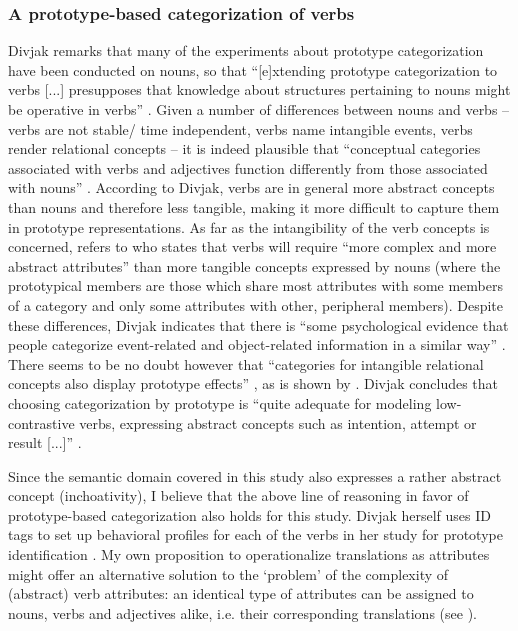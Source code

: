 \subsubsection{A prototype-based categorization of verbs}
\label{sec:2.4.3.2} 
Divjak remarks that many of the experiments about prototype categorization have been conducted on nouns, so that “[e]xtending prototype categorization to verbs [...] presupposes that knowledge about structures pertaining to nouns might be operative in verbs” \citep[150]{divjak_structuring_2010}. Given a number of differences between nouns and verbs –verbs are not stable/ time independent, verbs name intangible events, verbs render relational concepts \citep{divjak_structuring_2010} – it is indeed plausible that “conceptual categories associated with verbs and adjectives function differently from those associated with nouns” \citep{divjak_structuring_2010}. According to Divjak, verbs are in general more abstract concepts than nouns and therefore less tangible, making it more difficult to capture them in prototype representations. As far as the intangibility of the verb concepts is concerned, \citet[152]{divjak_structuring_2010} refers to \citet[114]{pulman_word_1983} who states that verbs will require “more complex and more abstract attributes” than more tangible concepts expressed by nouns (where the prototypical members are those which share most attributes with some members of a category and only some attributes with other, peripheral members). Despite these differences, Divjak indicates that there is “some psychological evidence that people categorize event-related and object-related information in a similar way” \citep[151]{divjak_structuring_2010}. There seems to be no doubt however that “categories for intangible relational concepts also display prototype effects” \citep[153]{divjak_structuring_2010}, as is shown by \citet{schmid_cottage_1993,taylor_linguistic_1995,taylor_linguistic_2003,geeraerts_preponderantieverschillen_1985, rudzka-ostyn_where_1988, geeraerts_homonymy_1990} \citep[153]{divjak_structuring_2010}. Divjak concludes that choosing categorization by prototype is “quite adequate for modeling low-contrastive verbs, expressing abstract concepts such as intention, attempt or result [...]” \citep[150]{divjak_structuring_2010}.

Since the semantic domain covered in this study also expresses a rather abstract concept (inchoativity), I believe that the above line of reasoning in favor of prototype-based categorization also holds for this study. Divjak herself uses ID tags to set up behavioral profiles for each of the verbs in her study for prototype identification \citep[158]{divjak_structuring_2010}. My own proposition to operationalize translations as attributes might offer an alternative solution to the ‘problem’ of the complexity of (abstract) verb attributes: an identical type of attributes can be assigned to nouns, verbs and adjectives alike, i.e. their corresponding translations (see ).

